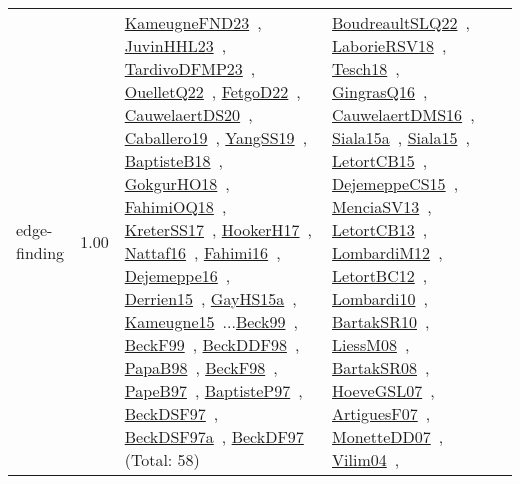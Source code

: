{\begin{longtable}{p{3cm}r>{\raggedright\arraybackslash}p{6cm}>{\raggedright\arraybackslash}p{6cm}>{\raggedright\arraybackslash}p{8cm}}
\index{edge-finding}\index{Algorithms!edge-finding}edge-finding &  1.00 & \href{../works/KameugneFND23.pdf}{KameugneFND23}~\cite{KameugneFND23}, \href{../works/JuvinHHL23.pdf}{JuvinHHL23}~\cite{JuvinHHL23}, \href{../works/TardivoDFMP23.pdf}{TardivoDFMP23}~\cite{TardivoDFMP23}, \href{../works/OuelletQ22.pdf}{OuelletQ22}~\cite{OuelletQ22}, \href{../works/FetgoD22.pdf}{FetgoD22}~\cite{FetgoD22}, \href{../works/CauwelaertDS20.pdf}{CauwelaertDS20}~\cite{CauwelaertDS20}, \href{../works/Caballero19.pdf}{Caballero19}~\cite{Caballero19}, \href{../works/YangSS19.pdf}{YangSS19}~\cite{YangSS19}, \href{../works/BaptisteB18.pdf}{BaptisteB18}~\cite{BaptisteB18}, \href{../works/GokgurHO18.pdf}{GokgurHO18}~\cite{GokgurHO18}, \href{../works/FahimiOQ18.pdf}{FahimiOQ18}~\cite{FahimiOQ18}, \href{../works/KreterSS17.pdf}{KreterSS17}~\cite{KreterSS17}, \href{../works/HookerH17.pdf}{HookerH17}~\cite{HookerH17}, \href{../works/Nattaf16.pdf}{Nattaf16}~\cite{Nattaf16}, \href{../works/Fahimi16.pdf}{Fahimi16}~\cite{Fahimi16}, \href{../works/Dejemeppe16.pdf}{Dejemeppe16}~\cite{Dejemeppe16}, \href{../works/Derrien15.pdf}{Derrien15}~\cite{Derrien15}, \href{../works/GayHS15a.pdf}{GayHS15a}~\cite{GayHS15a}, \href{../works/Kameugne15.pdf}{Kameugne15}~\cite{Kameugne15}...\href{../works/Beck99.pdf}{Beck99}~\cite{Beck99}, \href{../works/BeckF99.pdf}{BeckF99}~\cite{BeckF99}, \href{../works/BeckDDF98.pdf}{BeckDDF98}~\cite{BeckDDF98}, \href{../works/PapaB98.pdf}{PapaB98}~\cite{PapaB98}, \href{../works/BeckF98.pdf}{BeckF98}~\cite{BeckF98}, \href{../works/PapeB97.pdf}{PapeB97}~\cite{PapeB97}, \href{../works/BaptisteP97.pdf}{BaptisteP97}~\cite{BaptisteP97}, \href{../works/BeckDSF97.pdf}{BeckDSF97}~\cite{BeckDSF97}, \href{../works/BeckDSF97a.pdf}{BeckDSF97a}~\cite{BeckDSF97a}, \href{../works/BeckDF97.pdf}{BeckDF97}~\cite{BeckDF97} (Total: 58) & \href{../works/BoudreaultSLQ22.pdf}{BoudreaultSLQ22}~\cite{BoudreaultSLQ22}, \href{../works/LaborieRSV18.pdf}{LaborieRSV18}~\cite{LaborieRSV18}, \href{../works/Tesch18.pdf}{Tesch18}~\cite{Tesch18}, \href{../works/GingrasQ16.pdf}{GingrasQ16}~\cite{GingrasQ16}, \href{../works/CauwelaertDMS16.pdf}{CauwelaertDMS16}~\cite{CauwelaertDMS16}, \href{../works/Siala15a.pdf}{Siala15a}~\cite{Siala15a}, \href{../works/Siala15.pdf}{Siala15}~\cite{Siala15}, \href{../works/LetortCB15.pdf}{LetortCB15}~\cite{LetortCB15}, \href{../works/DejemeppeCS15.pdf}{DejemeppeCS15}~\cite{DejemeppeCS15}, \href{../works/MenciaSV13.pdf}{MenciaSV13}~\cite{MenciaSV13}, \href{../works/LetortCB13.pdf}{LetortCB13}~\cite{LetortCB13}, \href{../works/LombardiM12.pdf}{LombardiM12}~\cite{LombardiM12}, \href{../works/LetortBC12.pdf}{LetortBC12}~\cite{LetortBC12}, \href{../works/Lombardi10.pdf}{Lombardi10}~\cite{Lombardi10}, \href{../works/BartakSR10.pdf}{BartakSR10}~\cite{BartakSR10}, \href{../works/LiessM08.pdf}{LiessM08}~\cite{LiessM08}, \href{../works/BartakSR08.pdf}{BartakSR08}~\cite{BartakSR08}, \href{../works/HoeveGSL07.pdf}{HoeveGSL07}~\cite{HoeveGSL07}, \href{../works/ArtiguesF07.pdf}{ArtiguesF07}~\cite{ArtiguesF07}, \href{../works/MonetteDD07.pdf}{MonetteDD07}~\cite{MonetteDD07}, \href{../works/Vilim04.pdf}{Vilim04}~\cite{Vilim04}, 
\end{longtable}}
